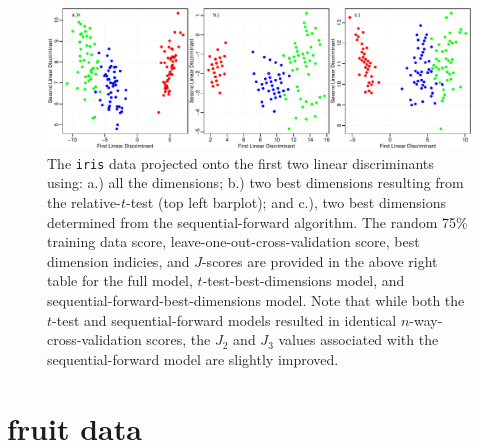 \begin{figure}[H]
\begin{minipage}[b]{0.45\linewidth}
  \end{minipage}
  \hfill
  \vspace{5mm}
  \quad
  \begin{minipage}[t]{1.00\linewidth}
    \includegraphics[width=\linewidth]{images/iris.pdf}
  \end{minipage}
  \caption{The \texttt{iris} data projected onto the first two linear discriminants using: a.) all the dimensions; b.) two best dimensions resulting from the relative-$t$-test (top left barplot); and c.), two best dimensions determined from the sequential-forward algorithm.  The random 75\% training data score, leave-one-out-cross-validation score, best dimension indicies, and $J$-scores are provided in the above right table for the full model, $t$-test-best-dimensions model, and sequential-forward-best-dimensions model.   Note that while both the $t$-test and sequential-forward models resulted in identical $n$-way-cross-validation scores, the $J_2$ and $J_3$ values associated with the sequential-forward model are slightly improved.}
\end{figure}

\section{fruit data}

